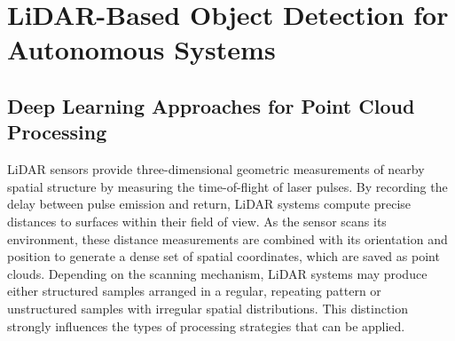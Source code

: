 \documentclass{erauthesis}
\begin{document}



\section{LiDAR-Based Object Detection for Autonomous Systems}

\subsection{Deep Learning Approaches for Point Cloud Processing}

\Ac{LiDAR} sensors provide three-dimensional geometric measurements of nearby spatial structure by measuring the time-of-flight of laser pulses.
By recording the delay between pulse emission and return, \ac{LiDAR} systems compute precise distances to surfaces within their field of view. As the sensor scans its environment, these distance measurements are combined with its orientation and position to generate a dense set of spatial coordinates, which are saved as point clouds.
Depending on the scanning mechanism, \ac{LiDAR} systems may produce either structured samples arranged in a regular, repeating pattern or unstructured samples with irregular spatial distributions. This distinction strongly influences the types of processing strategies that can be applied.
\end{document}
